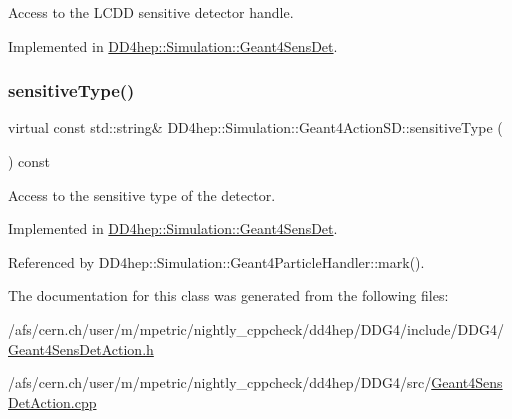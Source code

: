 Access to the L\+C\+DD sensitive detector handle. 



Implemented in \hyperlink{class_d_d4hep_1_1_simulation_1_1_geant4_sens_det_ada24f1cfac58e4f10581e1855eda59f0}{D\+D4hep\+::\+Simulation\+::\+Geant4\+Sens\+Det}.

\hypertarget{class_d_d4hep_1_1_simulation_1_1_geant4_action_s_d_ad2aec470fc9632ab3082b51b16a75c00}{}\label{class_d_d4hep_1_1_simulation_1_1_geant4_action_s_d_ad2aec470fc9632ab3082b51b16a75c00} 
\subsubsection{\texorpdfstring{sensitive\+Type()}{sensitiveType()}}
{\footnotesize\ttfamily virtual const std\+::string\& D\+D4hep\+::\+Simulation\+::\+Geant4\+Action\+S\+D\+::sensitive\+Type (\begin{DoxyParamCaption}{ }\end{DoxyParamCaption}) const\hspace{0.3cm}{\ttfamily [pure virtual]}}



Access to the sensitive type of the detector. 



Implemented in \hyperlink{class_d_d4hep_1_1_simulation_1_1_geant4_sens_det_a90e504184bd398b1df950000c6aa3b8a}{D\+D4hep\+::\+Simulation\+::\+Geant4\+Sens\+Det}.



Referenced by D\+D4hep\+::\+Simulation\+::\+Geant4\+Particle\+Handler\+::mark().



The documentation for this class was generated from the following files\+:\begin{DoxyCompactItemize}
\item 
/afs/cern.\+ch/user/m/mpetric/nightly\+\_\+cppcheck/dd4hep/\+D\+D\+G4/include/\+D\+D\+G4/\hyperlink{_geant4_sens_det_action_8h}{Geant4\+Sens\+Det\+Action.\+h}\item 
/afs/cern.\+ch/user/m/mpetric/nightly\+\_\+cppcheck/dd4hep/\+D\+D\+G4/src/\hyperlink{_geant4_sens_det_action_8cpp}{Geant4\+Sens\+Det\+Action.\+cpp}\end{DoxyCompactItemize}
